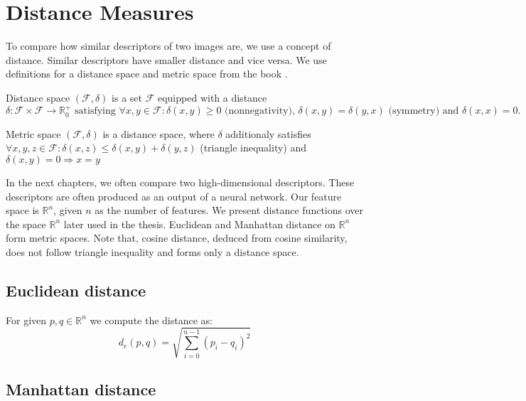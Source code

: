 \section{Distance Measures}
\label{s:distance_measures}

To compare how similar descriptors of two images are, we use a concept of distance. Similar descriptors have smaller distance and vice versa. We use definitions for a distance space and metric space from the book \cite{deza2009encyclopedia}.

\theoremstyle{definition}
\begin{definition}{Distance space}
$(\mathcal{F}, \delta )$ is a set $\mathcal{F}$ equipped
with a distance $\delta : \mathcal{F} \times \mathcal{F} \rightarrow \mathbb{R}^+_0 \text{ satisfying } \forall x, y \in \mathcal{F}: \delta(x, y) \geq 0 \text{ (nonnegativity), } \delta(x, y) = \delta(y, x) \text{ (symmetry) and } \delta(x, x) = 0.$
\end{definition}

\theoremstyle{definition}
\begin{definition}{Metric space}
$(\mathcal{F}, \delta)$ is a distance space, where $\delta$ additionaly satisfies $\forall x, y, z \in \mathcal{F} : \delta(x,z) \leq \delta(x,y) + \delta(y,z)$ (triangle inequality) and $\delta(x, y) = 0 \Rightarrow x = y$
\end{definition}

In the next chapters, we often compare two high-dimensional descriptors. These descriptors are often produced as an output of a neural network. Our feature space is $\mathbb{R}^n$, given $n$ as the number of features. We present distance functions over the space $\mathbb{R}^n$ later used in the thesis. Euclidean and Manhattan distance on $\mathbb{R}^n$ form metric spaces. Note that, cosine distance, deduced from cosine similarity, does not follow triangle inequality and forms only a distance space.

\subsection{Euclidean distance}

For given $p, q \in \mathbb{R}^n$ we compute the distance as:
\begin{equation}
d_e({p},{q}) = \sqrt{\sum_{i=0}^{n-1} (p_i - q_i)^2}    
\end{equation}


\subsection{Manhattan distance}

